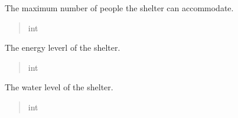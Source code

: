 \documentclass[letterpaper,10pt,english]{sphinxmanual}
\begin{document}
\begin{fulllineitems}
\begin{fulllineitems}
\label{\detokenize{app.mysql:app.mysql.shelter.Shelter.maxPeople}}
\pysigstartsignatures
\pysigline
{}
\pysigstopsignatures
\sphinxAtStartPar
The maximum number of people the shelter can accommodate.
\begin{quote}\begin{description}
\sphinxAtStartPar
int

\end{description}\end{quote}

\end{fulllineitems}


\begin{fulllineitems}
\label{\detokenize{app.mysql:app.mysql.shelter.Shelter.energyLevel}}
\pysigstartsignatures
\pysigline
{}
\pysigstopsignatures
\sphinxAtStartPar
The energy leverl of the shelter.
\begin{quote}\begin{description}
\sphinxAtStartPar
int

\end{description}\end{quote}

\end{fulllineitems}


\begin{fulllineitems}
\label{\detokenize{app.mysql:app.mysql.shelter.Shelter.waterLevel}}
\pysigstartsignatures
\pysigline
{}
\pysigstopsignatures
\sphinxAtStartPar
The water level of the shelter.
\begin{quote}\begin{description}
\sphinxAtStartPar
int

\end{description}\end{quote}

\end{fulllineitems}



\end{fulllineitems}
\end{document}
